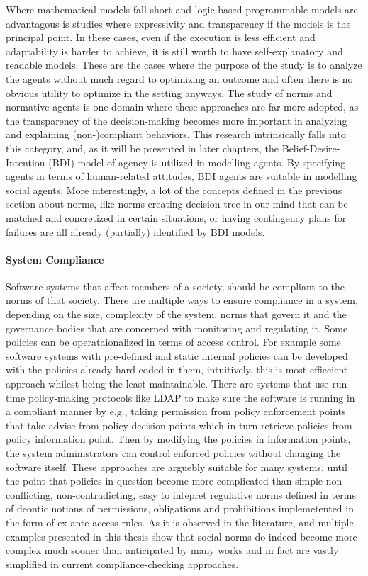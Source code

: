 Where mathematical models fall short and logic-based programmable models are advantagous is studies where expressivity and transparency if the models is the principal point. In these cases, even if the execution is less efficient and adaptability is harder to achieve, it is still worth to have self-explanatory and readable models. These are the cases where the purpose of the study is to analyze the agents without much regard to optimizing an outcome and often there is no obvious utility to optimize in the setting anyways. The study of norms and normative agents is one domain where these approaches are far more adopted, as the transparency of the decision-making becomes more important in analyzing and explaining (non-)compliant behaviors. This research intrinsically falls into this category, and, as it will be presented in later chapters, the Belief-Desire-Intention (BDI) model of agency \cite{Something} is utilized in modelling agents. By specifying agents in terms of human-related attitudes, BDI agents are suitable in modelling social agents. More interestingly, a lot of the concepts defined in the previous section about norms, like norms creating decision-tree in our mind that can be matched and concretized in certain situations, or having contingency plans for failures are all already (partially) identified by BDI models.


\paragraph{System Compliance}
Software systems that affect members of a society, should be compliant to the norms of that society. There are multiple ways to ensure compliance in a system, depending on the size, complexity of the system, norms that govern it and the governance bodies that are concerned with monitoring and regulating it. Some policies can be operataionalized in terms of access control. For example some software systems with pre-defined and static internal policies can be developed with the policies already hard-coded in them, intuitively, this is most effiecient approach whilest being the least maintainable. There are systems that use run-time policy-making protocols like LDAP to make sure the software is running in a compliant manner by e.g., taking permission from policy enforcement points that take advise from policy decision points which in turn retrieve policies from policy information point. Then by modifying the policies in information points, the system administrators can control enforced policies without changing the software itself. These approaches are arguebly suitable for many systems, until the point that policies in question become more complicated than simple non-conflicting, non-contradicting, easy to intepret regulative norms defined in terms of deontic notions of permissions, obligations and prohibitions implemetented in the form of ex-ante access rules. As it is observed in the literature, and multiple examples presented in this thesis show that social norms do indeed become more complex much sooner than anticipated by many works and in fact are vastly simplified in current compliance-checking approaches. 


